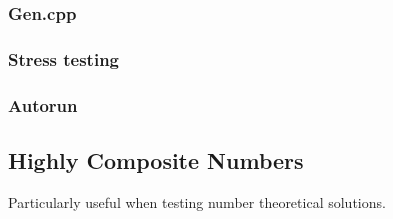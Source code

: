 \subsubsection{Gen.cpp}
\subsubsection{Stress testing}
%
\subsubsection{Autorun}
%
\subsection{Highly Composite Numbers}
Particularly useful when testing number theoretical solutions.
%




